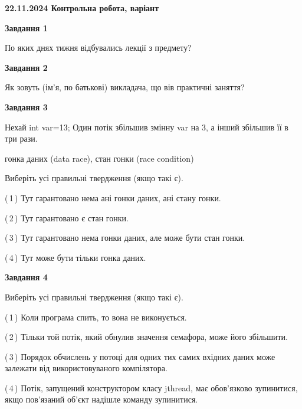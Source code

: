\documentclass[12pt, ukrainian]{article}
\begin{document}
\begin {large}

\textbf{22.11.2024 Контрольна робота, варіант  }\par


{

\begin{center}
\textbf{Завдання 1}
\end{center}

По яких днях тижня відбувались лекції з предмету?


\begin{center}
\textbf{Завдання 2}
\end{center}

Як зовуть (ім'я, по батькові) викладача, що вів практичні заняття?


\begin{center}
\textbf{Завдання 3}
\end{center}

Нехай int var=13; Один потік збільшив змінну var на 3, а інший збільшив її в три рази.

гонка даних (data race), стан гонки (race condition)

Виберіть усі правильні твердження (якщо такі є).\par
\vspace{2mm}
(\,1\,) Тут гарантовано нема ані гонки даних, ані стану гонки.%

(\,2\,) Тут гарантовано є стан гонки.%

(\,3\,) Тут гарантовано нема гонки даних, але може бути стан гонки.%

(\,4\,) Тут може бути тільки гонка даних.%


\begin{center}
\textbf{Завдання 4}
\end{center}

Виберіть усі правильні твердження (якщо такі є).\par
\vspace{2mm}

(\,1\,) Коли програма спить, то вона не виконується.%

(\,2\,) Тільки той потік, який обнулив значення семафора, може його збільшити.%

(\,3\,) Порядок обчислень у потоці для одних тих самих вхідних даних може залежати від використовуваного компілятора.%

(\,4\,) Потік, запущений конструктором класу jthread, має обов’язково зупинитися, якщо пов’язаний об’єкт надішле команду зупинитися.%


}
\end{large}
\end{document}
